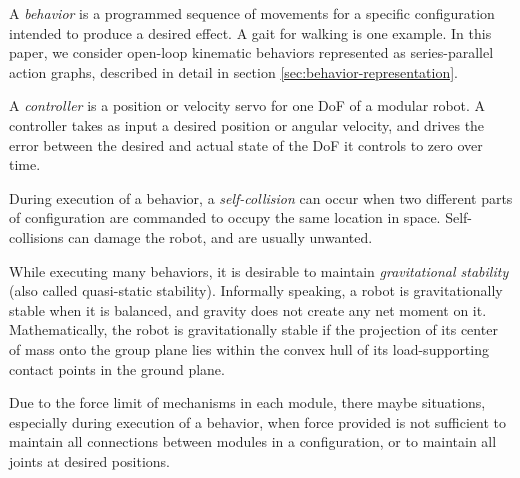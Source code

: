 \documentclass[graybox]{svmult}
\begin{document}
\begin{definition}[Behavior]\label{def:behavior}
A \textit{behavior} is a programmed sequence of movements for a specific configuration
intended to produce a desired effect.  A gait for walking is one example.  In
this paper, we consider open-loop kinematic behaviors represented as
series-parallel action graphs, described in detail in section
\ref{sec:behavior-representation}.
\end{definition}
\begin{definition}[Controller]
A \textit{controller} is a position or velocity servo for one DoF of a modular
robot.  A controller takes as input a desired position or angular velocity, and
drives the error between the desired and actual state of the DoF it controls to
zero over time.
\end{definition}
\begin{definition}
During execution of a behavior, a \textit{self-collision} can occur when two
different parts of configuration are commanded to occupy the same location in
space.  Self-collisions can damage the robot, and are usually unwanted.
\end{definition}
\begin{definition}
While executing many behaviors, it is desirable to maintain \textit{gravitational
stability} (also called quasi-static stability).  Informally speaking, a
robot is gravitationally stable when it is balanced, and gravity does not
create any net moment on it.  Mathematically, the robot is gravitationally stable
if the projection of its center of
mass onto the group plane lies within the convex hull of its load-supporting contact points in the
ground plane.
\end{definition}
\begin{definition}
Due to the force limit of mechanisms in each module, there maybe situations, 
especially during execution of a behavior, when force provided is not sufficient to
maintain all connections between modules in a configuration, or to maintain all joints at desired positions.
\end{definition}
\end{document}
